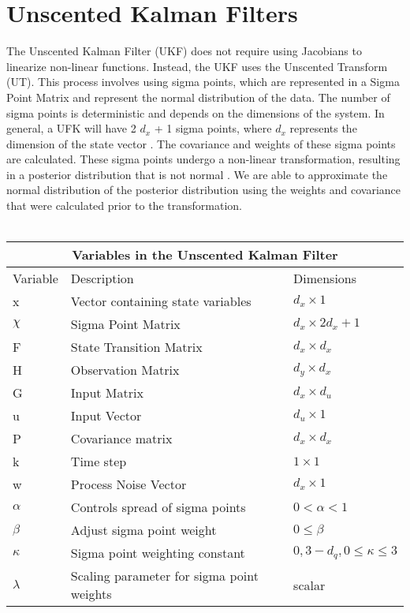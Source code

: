 \chapter{Unscented Kalman Filters}
\label{Unscented Kalman Filters}

The Unscented Kalman Filter (UKF) does not require using Jacobians to linearize non-linear functions. Instead, the UKF uses the Unscented Transform (UT). This process involves using sigma points, which are represented in a Sigma Point Matrix and represent the normal distribution of the data. The number of sigma points is deterministic and depends on the dimensions of the system. In general, a UFK will have 2 $d_x$ + 1 sigma points, where $d_x$ represents the dimension of the state vector \cite{inbook, inproceedings, Wan01theunscented}. The covariance and weights of these sigma points are calculated. These sigma points undergo a non-linear transformation, resulting in a posterior distribution that is not normal \cite{inbook, Wan01theunscented} . We are able to approximate the normal distribution of the posterior distribution using the weights and covariance that were calculated prior to the transformation. \\ \\
\begin{center}
    
\centering
\begin{tabular}{ |p{2cm}||p{5cm}|p{2cm}| }
    \hline
    \multicolumn{3}{|c|}{Variables in the Unscented Kalman Filter } \\ 
    \hline
    Variable & Description & Dimensions \\
    \hline
    x & Vector containing state variables & $d_x \times 1 $\\ 
    $\chi $& Sigma Point Matrix &$ d_x \times 2 d_x + 1 $\\
    F & State Transition Matrix  & $d_x \times d_x $  \\ 
    H & Observation Matrix & $d_y \times d_x$\\
    G & Input Matrix & $d_x \times d_u$\\
    u & Input Vector  & $d_u \times 1$\\
    P & Covariance matrix & $d_x \times d_x $  \\
    k & Time step  & $1 \times 1$\\
    w & Process Noise Vector & $d_x \times 1$\\
    $\alpha$ & Controls spread of sigma points & $0 <  \alpha < 1$ \\
    $\beta$ & Adjust sigma point weight & $0 \leq  \beta$ \\
    $\kappa $ & Sigma point weighting constant & $0, 3 - d_q, 0 \leq \kappa \leq 3$ \\
    $\lambda $ & Scaling parameter for sigma point weights & scalar \\
    \hline
\end{tabular}
\end{center}

